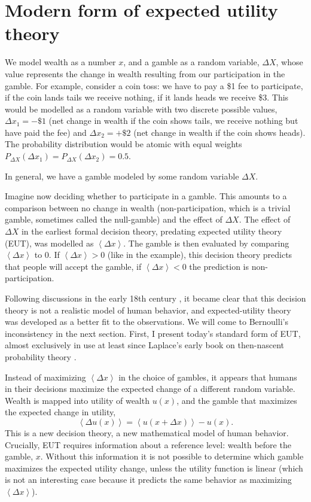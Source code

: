 \documentclass[dvips,draft]{ectaart}
\newcommand{\ave}[1]{\left\langle#1 \right\rangle}
\newcommand{\be}{\begin{equation}}
\newcommand{\ee}{\end{equation}}
\newcommand{\Dx}{{\Delta x}}
\newcommand{\DX}{{\Delta X}}
\newcommand{\Du}{\Delta u}
\begin{document}
\section{Modern form of expected utility theory}
We model wealth as a number $x$, and a gamble as a random variable, $\DX$, whose value represents the change in wealth resulting from our participation in the gamble. For example, consider a coin toss: we have to pay a \$1 fee to participate, if the coin lands tails we receive nothing, if it lands heads we receive \$3. This would be modelled as a random variable with two discrete possible values, $\Dx_1=-\$1$ (net change in wealth if the coin shows tails, we receive nothing but have paid the fee) and $\Dx_2=+\$2$ (net change in wealth if the coin shows heads). The probability distribution would be atomic with equal weights $P_\DX(\Dx_1)=P_\DX(\Dx_2)=0.5$.

In general, we have a gamble modeled by some random variable $\DX$.

Imagine now deciding whether to participate in a gamble. This amounts to a comparison between no change in wealth (non-participation, which is a trivial gamble, sometimes called the null-gamble) and the effect of $\DX$. The effect of $\DX$ in the earliest formal decision theory, predating expected utility theory (EUT), was modelled as $\ave{\Dx}$. The gamble is then evaluated by comparing $\ave{\Dx}$ to 0. If $\ave{\Dx}>0$ (like in the example), this decision theory predicts that people will accept the gamble, if $\ave{\Dx}<0$ the prediction is non-participation.

Following discussions in the early 18th century \cite[p.~402]{Montmort1713}, it became clear that this decision theory is not a realistic model of human behavior, and expected-utility theory was developed as a better fit to the observations. We will come to Bernoulli's inconsistency in the next section. First, I present today's standard form of EUT, almost exclusively in use at least since Laplace's early book on then-nascent probability theory \cite{Laplace1814}. 

Instead of maximizing $\ave{\Dx}$ in the choice of gambles, it appears that humans in their decisions maximize the expected change of a different random variable. Wealth is mapped into utility of wealth $u(x)$, and the gamble that maximizes the expected change in utility, 
\be
\ave{\Du(x)}=\ave{u(x+\Dx)}-u(x).
\ee
This is a new decision theory, a new mathematical model of human behavior. Crucially, EUT requires information about a reference level: wealth before the gamble, $x$. Without this information it is not possible to determine which gamble maximizes the expected utility change, unless the utility function is linear (which is not an interesting case because it predicts the same behavior as maximizing $\ave{\Dx}$).
\end{document}
